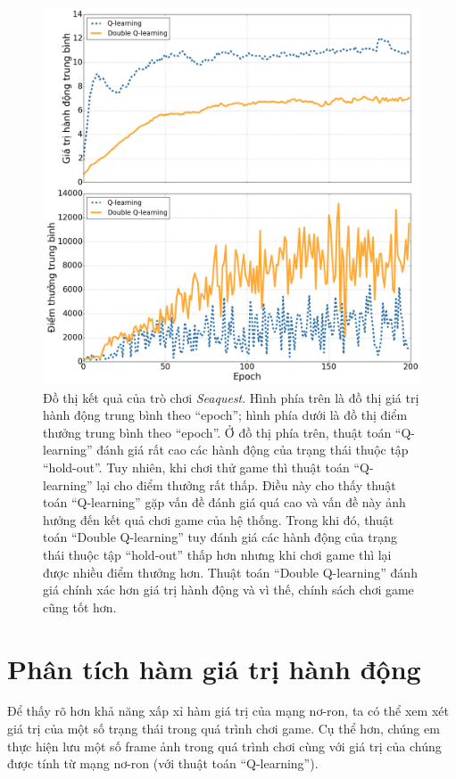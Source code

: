 	\begin{figure}
		\centering
		\includegraphics[width=\textwidth]{double_compare}
		\caption[Đồ thị giá trị hành động trung bình và điểm thưởng trung bình của hai thuật toán]{
		Đồ thị kết quả của trò chơi \textit{Seaquest}.
		Hình phía trên là đồ thị giá trị hành động trung bình theo ``epoch''; hình phía dưới là đồ thị điểm thưởng trung bình theo ``epoch''.
		Ở đồ thị phía trên, thuật toán ``Q-learning'' đánh giá rất cao các hành động của trạng thái thuộc tập ``hold-out''.
		Tuy nhiên, khi chơi thử game thì thuật toán ``Q-learning'' lại cho điểm thưởng rất thấp.
		Điều này cho thấy thuật toán ``Q-learning'' gặp vấn đề đánh giá quá cao và vấn đề này ảnh hưởng đến kết quả chơi game của hệ thống.
		Trong khi đó, thuật toán ``Double Q-learning'' tuy đánh giá các hành động của trạng thái thuộc tập ``hold-out'' thấp hơn nhưng khi chơi game thì lại được nhiều điểm thưởng hơn.
		Thuật toán ``Double Q-learning'' đánh giá chính xác hơn giá trị hành động và vì thế, chính sách chơi game cũng tốt hơn.}
		\label{fig_double_compare}
	\end{figure}
		
\section{Phân tích hàm giá trị hành động}
	Để thấy rõ hơn khả năng xấp xỉ hàm giá trị của mạng nơ-ron, ta có thể xem xét giá trị của một số trạng thái trong quá trình chơi game.
	Cụ thể hơn, chúng em thực hiện lưu một số frame ảnh trong quá trình chơi cùng với giá trị của chúng được tính từ mạng nơ-ron (với thuật toán ``Q-learning'').
	
